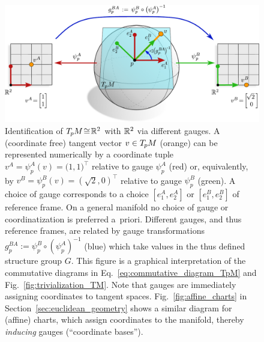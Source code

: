 \begin{figure}
    \centering
    \includegraphics[width=\columnwidth]{figures/gauges_TpM.pdf}
    \caption{\small
        Identification of $T_{\mkern-1.5mu p}\mkern-.5muM\!\cong\!\mathbb{R}^2$ with $\mathbb{R}^2$ via different gauges.
        A (coordinate free) tangent vector $v\in T_{\mkern-1.5mu p}\mkern-.5muM$ (orange) can be represented numerically by a coordinate tuple $v^A=\psi_p^A(v)=\big(1,1\big)^\top$ relative to gauge $\psi_p^A$ (red) or, equivalently, by $v^B=\psi_p^B(v)=(\sqrt{2},0)^\top$ relative to gauge $\psi_p^B$ (green).
        A choice of gauge corresponds to a choice $[e_1^A,e_2^A]$ or $[e_1^B,e_2^B]$ of reference frame.
        On a general manifold no choice of gauge or coordinatization is preferred a~priori.
        Different gauges, and thus reference frames, are related by gauge transformations $g_p^{BA}:=\psi_p^B\circ(\psi_p^A)^{-1}$ (blue) which take values in the thus defined structure group $G$.
        This figure is a graphical interpretation of the commutative diagrams in Eq.~\eqref{eq:commutative_diagram_TpM} and Fig.~\ref{fig:trivialization_TM}.
        Note that gauges are immediately assigning coordinates to tangent spaces.
        Fig.~\ref{fig:affine_charts} in Section~\ref{sec:euclidean_geometry} shows a similar diagram for (affine) charts, which assign coordinates to the manifold, thereby \emph{inducing} gauges (``coordinate bases'').
        }
    \label{fig:gauge_trafos}
\end{figure}


